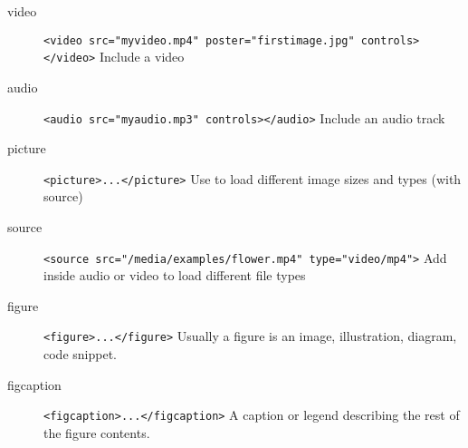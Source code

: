 \begin{description}
    \item[video] \texttt{<video src="myvideo.mp4" poster="firstimage.jpg" controls></video>} Include a video
    \item[audio] \texttt{<audio src="myaudio.mp3" controls></audio>} Include an audio track
    \item[picture] \texttt{<picture>...</picture>} Use to load different image sizes and types (with source)
    \item[source] \texttt{<source src="/media/examples/flower.mp4" type="video/mp4">} Add inside audio or video to load different file types
    \item[figure] \texttt{<figure>...</figure>} Usually a figure is an image, illustration, diagram, code snippet.
    \item[figcaption] \texttt{<figcaption>...</figcaption>} A caption or legend describing the rest of the figure contents.
\end{description}
